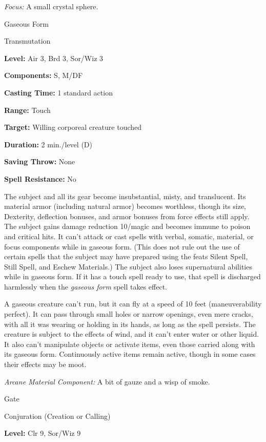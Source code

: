 \documentclass{article}
\begin{document}
\textit{Focus: }A small crystal sphere.

\vspace{12pt}
Gaseous Form

Transmutation

\textbf{Level:} Air 3, Brd 3, Sor/Wiz 3

\textbf{Components:} S, M/DF

\textbf{Casting Time:} 1 standard action

\textbf{Range:} Touch

\textbf{Target: }Willing corporeal creature touched

\textbf{Duration:} 2 min./level (D)

\textbf{Saving Throw:} None

\textbf{Spell Resistance:} No

The subject and all its gear become insubstantial, misty, and translucent. Its 
material armor (including natural armor) becomes worthless, though its size, Dexterity, 
deflection bonuses, and armor bonuses from force effects still apply. The subject 
gains damage reduction 10/magic and becomes immune to poison and critical hits. 
It can't attack or cast spells with verbal, somatic, material, or focus components 
while in gaseous form. (This does not rule out the use of certain spells that the 
subject may have prepared using the feats Silent Spell, Still Spell, and Eschew 
Materials.) The subject also loses supernatural abilities while in gaseous form. 
If it has a touch spell ready to use, that spell is discharged harmlessly when 
the \textit{gaseous form }spell takes effect.

A gaseous creature can't run, but it can fly at a speed of 10 feet (maneuverability 
perfect). It can pass through small holes or narrow openings, even mere cracks, 
with all it was wearing or holding in its hands, as long as the spell persists. 
The creature is subject to the effects of wind, and it can't enter water or other 
liquid. It also can't manipulate objects or activate items, even those carried 
along with its gaseous form. Continuously active items remain active, though in 
some cases their effects may be moot.

\textit{Arcane Material Component: }A bit of gauze and a wisp of smoke.

\vspace{12pt}
Gate

Conjuration (Creation or Calling)

\textbf{Level:} Clr 9, Sor/Wiz 9
\end{document}
